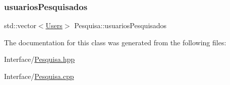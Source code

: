 \mbox{\label{class_pesquisa_a4abad4d5020c7ccb625d657d45675821}} 
\subsubsection{\texorpdfstring{usuarios\+Pesquisados}{usuariosPesquisados}}
{\footnotesize\ttfamily std\+::vector$<$\hyperlink{class_users}{Users}$>$ Pesquisa\+::usuarios\+Pesquisados\hspace{0.3cm}{\ttfamily [private]}}



The documentation for this class was generated from the following files\+:\begin{DoxyCompactItemize}
\item 
Interface/\hyperlink{_pesquisa_8hpp}{Pesquisa.\+hpp}\item 
Interface/\hyperlink{_pesquisa_8cpp}{Pesquisa.\+cpp}\end{DoxyCompactItemize}
